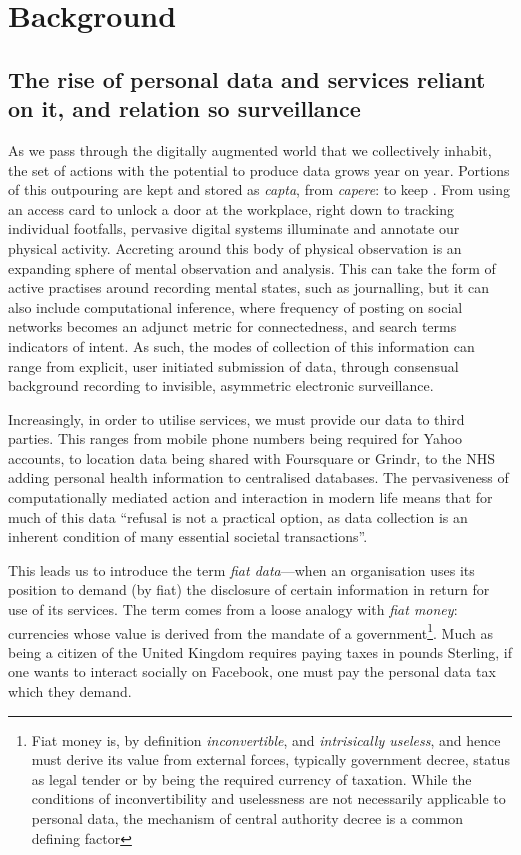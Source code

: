 \documentclass{IOS-Book-Article}     %
\begin{document}
\section{Background}

\subsection{The rise of personal data and services reliant on it, and relation
so surveillance}

As we pass through the digitally augmented world that we collectively inhabit,
the set of actions with the potential to produce data grows year on year.
Portions of this outpouring are kept and stored as
\emph{capta}, from \emph{capere}: to keep \cite{dodge2005codes}. From
using an access card to unlock a door at the workplace, right down to tracking
individual footfalls, pervasive digital systems illuminate and annotate our
physical activity. Accreting around this body of physical observation is an
expanding sphere of mental observation and analysis. This can take the form of
active practises around recording mental states, such as journalling, but it can
also include computational inference, where frequency of posting on social
networks becomes an adjunct metric for connectedness, and search terms 
indicators of intent. As such, the modes of collection of this information can
range from explicit, user initiated submission of data, through consensual
background recording to invisible, asymmetric electronic surveillance.

Increasingly, in order to utilise services, we must provide our data to third
parties. This ranges from mobile phone numbers being required for Yahoo
accounts, to location data being shared with Foursquare or Grindr, to the NHS
adding personal health information to centralised databases. 
The pervasiveness of computationally mediated action and interaction in modern
life means that for much of this data ``refusal is not a practical option, as
data collection is an inherent condition of many essential societal
transactions''\cite{brunton2011vernacular}. 

This leads us to introduce the term 
\emph{fiat data}---when an
organisation uses its position to demand (by fiat) the disclosure of certain
information in return for use of its services. The term comes from a loose
analogy with \emph{fiat money}: currencies whose value is derived from the
mandate of a government\footnote{Fiat money is, by definition
\emph{inconvertible}, and \emph{intrisically useless}, and hence must derive
its value from external forces, typically government decree, status as legal
tender or by being the required currency of taxation. While the conditions of
inconvertibility and uselessness are not necessarily applicable to personal
data, the mechanism of central authority decree is a common defining factor}. 
Much as being a citizen of the United Kingdom requires paying taxes in pounds
Sterling, if one wants to interact socially on Facebook, one must pay the
personal data tax which they demand. 
\end{document}
